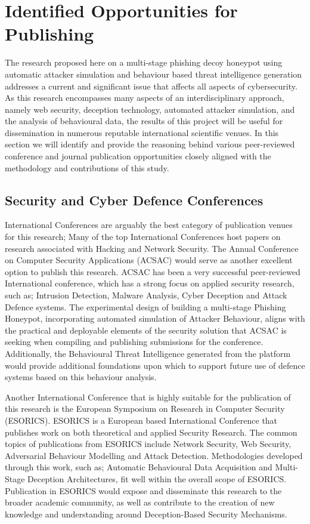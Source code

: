 \section{Identified Opportunities for Publishing}

The research proposed here on a multi-stage phishing decoy honeypot using automatic attacker simulation and behaviour based threat intelligence generation addresses a current and significant issue that affects all aspects of cybersecurity. As this research encompasses many aspects of an interdisciplinary approach, namely web security, deception technology, automated attacker simulation, and the analysis of behavioural data, the results of this project will be useful for dissemination in numerous reputable international scientific venues. In this section we will identify and provide the reasoning behind various peer-reviewed conference and journal publication opportunities closely aligned with the methodology and contributions of this study.

\subsection{Security and Cyber Defence Conferences}

International Conferences are arguably the best category of publication venues for this research; Many of the top International Conferences host papers on research associated with Hacking and Network Security. The Annual Conference on Computer Security Applications (ACSAC) would serve as another excellent option to publish this research. ACSAC has been a very successful peer-reviewed International conference, which has a strong focus on applied security research, such as; Intrusion Detection, Malware Analysis, Cyber Deception and Attack Defence systems. The experimental design of building a multi-stage Phishing Honeypot, incorporating automated simulation of Attacker Behaviour, aligns with the practical and deployable elements of the security solution that ACSAC is seeking when compiling and publishing submissions for the conference. Additionally, the Behavioural Threat Intelligence generated from the platform would provide additional foundations upon which to support future use of defence systems based on this behaviour analysis.

Another International Conference that is highly suitable for the publication of this research is the European Symposium on Research in Computer Security (ESORICS). ESORICS is a European based International Conference that publishes work on both theoretical and applied Security Research. The common topics of publications from ESORICS include Network Security, Web Security, Adversarial Behaviour Modelling and Attack Detection. Methodologies developed through this work, such as; Automatic Behavioural Data Acquisition and Multi-Stage Deception Architectures, fit well within the overall scope of ESORICS. Publication in ESORICS would expose and disseminate this research to the broader academic community, as well as contribute to the creation of new knowledge and understanding around Deception-Based Security Mechanisms.

